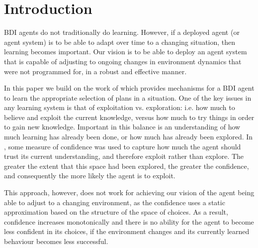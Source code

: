 \section{Introduction}\label{sec:introduction}

BDI agents do not traditionally do learning. However, if a deployed agent
(or agent system) is to be able to adapt over time to a changing
situation, then learning becomes important. Our vision is to be able
to deploy an agent system that is capable of adjusting to
ongoing changes in environment dynamics that were not 
programmed for, in a robust and effective manner.

In this paper we build on the work of \cite{airiau09:enhancing,singh10:extending,singh10:learning} which provides
mechanisms for a BDI agent to learn the appropriate selection of plans
in a situation. One of the key issues in any learning system is that of
exploitation vs. exploration: i.e. how much to believe and exploit the
current knowledge, versus how much to try things in order to gain new
knowledge. Important in this balance is an understanding of how much learning
has already been done, or how much has already been explored. In 
\cite{singh10:extending,singh10:learning}, some measure of confidence was used to capture
how much the agent should trust its current understanding, and
therefore exploit rather than explore. 
The greater the extent that this space had
been explored, the greater the confidence, and consequently the more
likely the agent is to exploit.  

This approach, however, does not work for achieving our vision of the
agent being able to adjust to a changing environment, as the confidence
uses a static approximation based on the structure of the
space of choices.
As a result, confidence increases monotonically and
there is no ability for the agent
to become less confident in its choices, if the environment changes
and its currently learned behaviour becomes less successful.


